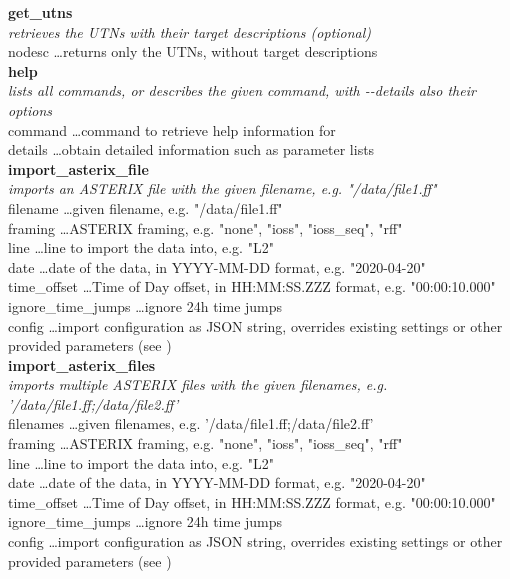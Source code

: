 \textbf{get\_utns} \\
\textit{retrieves the UTNs with their target descriptions (optional)} \\
nodesc \dots returns only the UTNs, without target descriptions \\

\textbf{help} \\
\textit{lists all commands, or describes the given command, with -{}-details also their options} \\
command \dots command to retrieve help information for \\
details	\dots obtain detailed information such as parameter lists \\

\textbf{import\_asterix\_file} \\
\textit{imports an ASTERIX file with the given filename, e.g. "/data/file1.ff"} \\
filename \dots given filename, e.g. "/data/file1.ff" \\
framing \dots ASTERIX framing, e.g. "none", "ioss", "ioss\_seq", "rff" \\
line \dots line to import the data into, e.g. "L2" \\
date \dots date of the data, in YYYY-MM-DD format, e.g. "2020-04-20" \\
time\_offset \dots Time of Day offset, in HH:MM:SS.ZZZ format, e.g. "00:00:10.000" \\
ignore\_time\_jumps \dots ignore 24h time jumps \\
config \dots import configuration as JSON string, overrides existing settings or other provided parameters (see ) \\

\textbf{import\_asterix\_files} \\
\textit{imports multiple ASTERIX files with the given filenames, e.g. '/data/file1.ff;/data/file2.ff'} \\
filenames \dots given filenames, e.g. '/data/file1.ff;/data/file2.ff' \\
framing \dots ASTERIX framing, e.g. "none", "ioss", "ioss\_seq", "rff" \\
line \dots line to import the data into, e.g. "L2" \\
date \dots date of the data, in YYYY-MM-DD format, e.g. "2020-04-20" \\
time\_offset \dots Time of Day offset, in HH:MM:SS.ZZZ format, e.g. "00:00:10.000" \\
ignore\_time\_jumps \dots ignore 24h time jumps \\
config \dots import configuration as JSON string, overrides existing settings or other provided parameters (see ) \\

